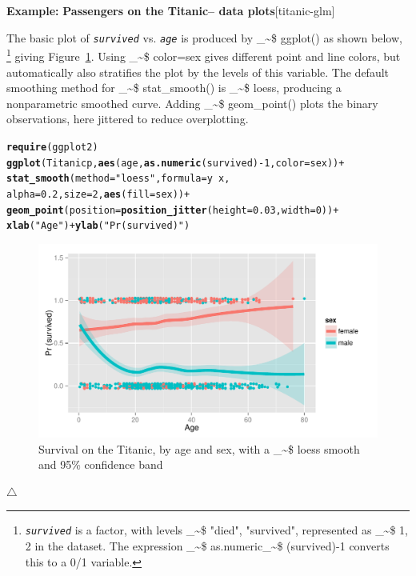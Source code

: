 \documentclass{article}
\makeatletter
\newcommand{\hlnum}[1]{\textcolor[rgb]{0.686,0.059,0.569}{#1}}%
\newcommand{\hlstr}[1]{\textcolor[rgb]{0.192,0.494,0.8}{#1}}%
\newcommand{\hlopt}[1]{\textcolor[rgb]{0,0,0}{#1}}%
\newcommand{\hlstd}[1]{\textcolor[rgb]{0.345,0.345,0.345}{#1}}%
\newcommand{\hlkwc}[1]{\textcolor[rgb]{0.333,0.667,0.333}{#1}}%
\newcommand{\hlkwd}[1]{\textcolor[rgb]{0.737,0.353,0.396}{\textbf{#1}}}%
\newenvironment{kframe}{%
 \def\at@end@of@kframe{}%
 \ifinner\ifhmode%
  \def\at@end@of@kframe{\end{minipage}}%
  \begin{minipage}{\columnwidth}%
 \fi\fi%
 \def\FrameCommand##1{\hskip\@totalleftmargin \hskip-\fboxsep
 \colorbox{shadecolor}{##1}\hskip-\fboxsep
     \hskip-\linewidth \hskip-\@totalleftmargin \hskip\columnwidth}%
 \MakeFramed {\advance\hsize-\width
   \@totalleftmargin\z@ \linewidth\hsize
   \@setminipage}}%
 {\par\unskip\endMakeFramed%
 \at@end@of@kframe}
\newenvironment{knitrout}{}{} %
\newcommand{\figref}[1]{Figure~\ref{#1}}
\newcommand{\var}[1]{\textit{\texttt{#1}}}
\newcommand\code{\bgroup\@makeother\_\@makeother\~\@makeother\$\@codex}
\def\@codex#1{{\normalfont\ttfamily\hyphenchar\font=-1 #1}\egroup}
\newcommand{\func}[1]{\code{#1()}}
\newenvironment{Example}[2][unnamed-example]%
  {\medskip\noindent\textbf{\textsf{Example:}}
   \textbf{#2}\hfill [#1]\par\smallskip
  }
  {\hfill $\triangle$}
\makeatother
\begin{document}
\begin{Example}[titanic-glm]{Passengers on the Titanic-- data plots}
The basic plot of \var{survived} vs. \var{age}
is produced
by \func{ggplot} as shown below,%
\footnote{
\var{survived} is a factor, with levels \code{"died", "survived"},
represented as \code{1, 2} in the dataset.
The expression \linebreak \code{as.numeric}\code{(survived)-1} converts this to
a 0/1 variable.
}
giving \figref{fig:titanic-glm-ggp1}.
Using \code{color=sex} 
gives different point and line colors, but automatically also
stratifies the plot by the levels of this variable.
The default smoothing method for \func{stat\_smooth} is \code{loess},
producing a nonparametric smoothed curve. 
Adding \func{geom\_point} plots the binary observations, here jittered
to reduce overplotting.
\begin{knitrout}
\color{fgcolor}\begin{kframe}
\begin{alltt}
\hlkwd{require}\hlstd{(ggplot2)}
\hlkwd{ggplot}\hlstd{(Titanicp,} \hlkwd{aes}\hlstd{(age,} \hlkwd{as.numeric}\hlstd{(survived)}\hlopt{-}\hlnum{1}\hlstd{,} \hlkwc{color}\hlstd{=sex))} \hlopt{+}
  \hlkwd{stat_smooth}\hlstd{(}\hlkwc{method}\hlstd{=}\hlstr{"loess"}\hlstd{,} \hlkwc{formula}\hlstd{=y}\hlopt{~}\hlstd{x,}
              \hlkwc{alpha}\hlstd{=}\hlnum{0.2}\hlstd{,} \hlkwc{size}\hlstd{=}\hlnum{2}\hlstd{,} \hlkwd{aes}\hlstd{(}\hlkwc{fill}\hlstd{=sex))} \hlopt{+}
  \hlkwd{geom_point}\hlstd{(}\hlkwc{position}\hlstd{=}\hlkwd{position_jitter}\hlstd{(}\hlkwc{height}\hlstd{=}\hlnum{0.03}\hlstd{,} \hlkwc{width}\hlstd{=}\hlnum{0}\hlstd{))} \hlopt{+}
  \hlkwd{xlab}\hlstd{(}\hlstr{"Age"}\hlstd{)} \hlopt{+} \hlkwd{ylab}\hlstd{(}\hlstr{"Pr (survived)"}\hlstd{)}
\end{alltt}
\end{kframe}\begin{figure}[hbt!]


{\centering \includegraphics[width=.6\linewidth]{figure/titanic-glm-ggp1} 

}

\caption[Survival on the Titanic, by age and sex, with a \code{loess} smooth and 95\% confidence band]{Survival on the Titanic, by age and sex, with a \code{loess} smooth and 95\% confidence band\label{fig:titanic-glm-ggp1}}
\end{figure}



\end{knitrout}
\end{Example}
\end{document}
